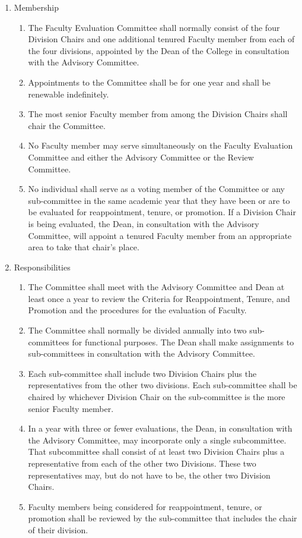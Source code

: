 \documentclass{manual}
\newcommand{\itemLevelA}{\alph*.}
\newcommand{\itemLevelB}{\arabic*)}
\newcommand{\itemRefA}{\alph*}
\newcommand{\itemRefB}{\arabic*}
\begin{document}
				\begin{enumerate}[label=\itemLevelA,ref=\itemRefA]
				\item Membership

					\begin{enumerate}[label=\itemLevelB,ref=\itemRefB]
					\item The Faculty Evaluation Committee shall normally consist of the four Division Chairs and one additional tenured Faculty member from each of the four divisions, appointed by the Dean of the College in consultation with the Advisory Committee.
					\item Appointments to the Committee shall be for one year and shall be renewable indefinitely.
					\item The most senior Faculty member from among the Division Chairs shall chair the Committee.
					\item No Faculty member may serve simultaneously on the Faculty Evaluation Committee and either the Advisory Committee or the Review Committee.
					\item No individual shall serve as a voting member of the Committee or any sub-committee in the same academic year that they have  been or are to be evaluated for reappointment, tenure, or promotion. If a Division Chair is being evaluated, the Dean, in consultation with the Advisory Committee, will appoint a tenured Faculty member from an appropriate area to take that chair's place.
					\end{enumerate}
				
				\item Responsibilities

					\begin{enumerate}[label=\itemLevelB,ref=\itemRefB]
					\item The Committee shall meet with the Advisory Committee and Dean at least once a year to review the Criteria for Reappointment, Tenure, and Promotion and the procedures for the evaluation of Faculty.
					\item The Committee shall normally be divided annually into two sub-committees for functional purposes. The Dean shall make assignments to sub-committees in consultation with the Advisory Committee.
					\item Each sub-committee shall include two Division Chairs plus the representatives from the other two divisions. Each sub-committee shall be chaired by whichever Division Chair on the sub-committee is the more senior Faculty member.
					\item In a year with three or fewer evaluations, the Dean, in consultation with the Advisory Committee, may incorporate only a single subcommittee. That subcommittee shall consist of at least two Division Chairs plus a representative from each of the other two Divisions. These two representatives may, but do not have to be, the other two Division Chairs.
					\item Faculty members being considered for reappointment, tenure, or promotion shall be reviewed by the sub-committee that includes the chair of their division.
					\end{enumerate}
				

\end{enumerate}
\end{document}
